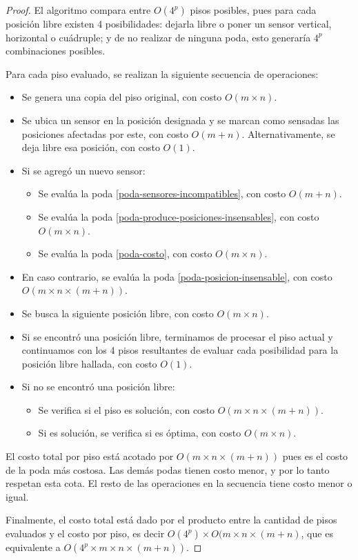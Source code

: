 \documentclass[a4paper, 10pt, twoside]{article}
\begin{document}
\begin{proof}
    El algoritmo compara entre $O(4^p)$ pisos posibles, pues para cada posición libre existen 4 posibilidades: dejarla libre o poner un sensor vertical, horizontal o cuádruple; y de no realizar de ninguna poda, esto generaría $4^p$ combinaciones posibles.

    Para cada piso evaluado, se realizan la siguiente secuencia de operaciones:

    \begin{itemize}
        \item{Se genera una copia del piso original, con costo $O(m \times n)$.}
        \item{Se ubica un sensor en la posición designada y se marcan como sensadas las posiciones afectadas por este, con costo $O(m + n)$. Alternativamente, se deja libre esa posición, con costo $O(1)$.}
        \item{
            Si se agregó un nuevo sensor:
            \begin{itemize}
                \item{Se evalúa la poda \ref{poda-sensores-incompatibles}, con costo $O(m + n)$.}
                \item{Se evalúa la poda \ref{poda-produce-posiciones-insensables}, con costo $O(m \times n)$.}
                \item{Se evalúa la poda \ref{poda-costo}, con costo $O(m \times n)$.}
            \end{itemize}
        }
        \item{En caso contrario, se evalúa la poda \ref{poda-posicion-insensable}, con costo $O(m \times n \times (m + n))$.}
        \item{Se busca la siguiente posición libre, con costo $O(m \times n)$.}
        \item{Si se encontró una posición libre, terminamos de procesar el piso actual y continuamos con los 4 pisos resultantes de evaluar cada posibilidad para la posición libre hallada, con costo $O(1)$.}
        \item{
            Si no se encontró una posición libre:
            \begin{itemize}
                \item{Se verifica si el piso es solución, con costo $O(m \times n \times (m + n))$.}
                \item{Si es solución, se verifica si es óptima, con costo $O(m \times n)$.}
            \end{itemize}
        }
    \end{itemize}

    El costo total por piso está acotado por $O(m \times n \times (m + n))$ pues es el costo de la poda más costosa. Las demás podas tienen costo menor, y por lo tanto respetan esta cota. El resto de las operaciones en la secuencia tiene costo menor o igual.

    Finalmente, el costo total está dado por el producto entre la cantidad de pisos evaluados y el costo por piso, es decir $O(4^p) \times O(m \times n \times (m + n)$, que es equivalente a $O(4^p \times m \times n \times (m + n))$.
\end{proof}
\end{document}
